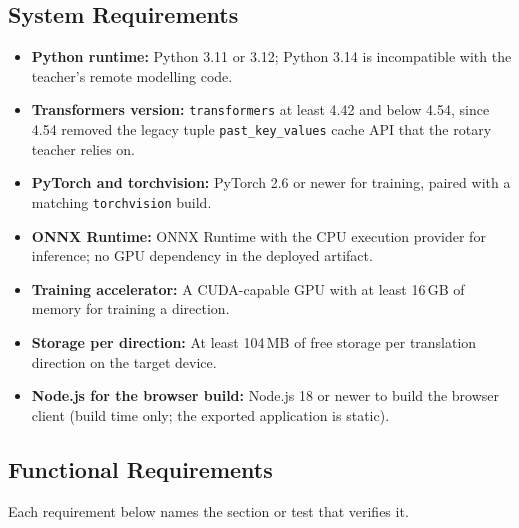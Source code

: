 \subsection{System Requirements}
\label{subsec:sysreq}

\begin{itemize}
  \item \textbf{Python runtime:} Python 3.11 or 3.12; Python 3.14 is incompatible with the
        teacher's remote modelling code.
  \item \textbf{Transformers version:} \texttt{transformers} at least 4.42 and below 4.54, since
        4.54 removed the legacy tuple \texttt{past\_key\_values} cache API that
        the rotary teacher relies on.
  \item \textbf{PyTorch and torchvision:} PyTorch 2.6 or newer for training, paired with a matching
        \texttt{torchvision} build.
  \item \textbf{ONNX Runtime:} ONNX Runtime with the CPU execution provider for
        inference; no GPU dependency in the deployed artifact.
  \item \textbf{Training accelerator:} A CUDA-capable GPU with at least 16\,GB of memory for
        training a direction.
  \item \textbf{Storage per direction:} At least 104\,MB of free storage per translation
        direction on the target device.
  \item \textbf{Node.js for the browser build:} Node.js 18 or newer to build the browser client (build
        time only; the exported application is static).
\end{itemize}

\subsection{Functional Requirements}
\label{subsec:funcreq}

Each requirement below names the section or test that verifies it.

